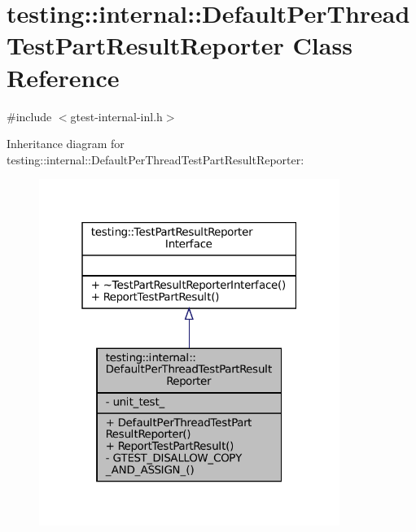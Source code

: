 \hypertarget{classtesting_1_1internal_1_1DefaultPerThreadTestPartResultReporter}{}\section{testing\+:\+:internal\+:\+:Default\+Per\+Thread\+Test\+Part\+Result\+Reporter Class Reference}
\label{classtesting_1_1internal_1_1DefaultPerThreadTestPartResultReporter}


{\ttfamily \#include $<$gtest-\/internal-\/inl.\+h$>$}



Inheritance diagram for testing\+:\+:internal\+:\+:Default\+Per\+Thread\+Test\+Part\+Result\+Reporter\+:
\nopagebreak
\begin{figure}[H]
\begin{center}
\leavevmode
\includegraphics[width=277pt]{classtesting_1_1internal_1_1DefaultPerThreadTestPartResultReporter__inherit__graph}
\end{center}
\end{figure}


